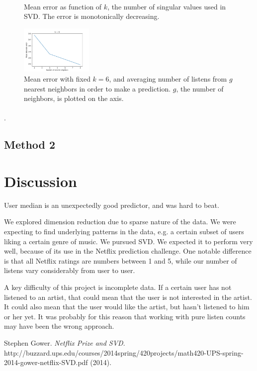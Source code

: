 \documentclass[11pt]{article}
\begin{document}
\begin{figure}[]
\begin{subfigure}[!t]{0.31\textwidth}
    \end{subfigure}\\
        \caption{Mean error as function of $k$, the number of singular values used in SVD. The error is monotonically decreasing.}
            \label{SVD_k}
\end{figure}


\begin{figure}[] 
\centering
        \includegraphics[width=0.31\textwidth]{Plots/SVD_group_8.png}
        \caption{Mean error with fixed $k=6$, and averaging number of listens from $g$ nearest neighbors in order to make a prediction. $g$, the number of neighbors, is plotted on the axis.}
            \label{SVD_g}
\end{figure}


\paragraph{}.
\subsection{Method 2}
\paragraph{}

\section{Discussion} 

User median is an unexpectedly good predictor, and was hard to beat.

We explored dimension reduction due to sparse nature of the data. We were expecting to find underlying patterns in the data, e.g. a certain subset of users liking a certain genre of music. We pursued SVD. We expected it to perform very well, because of its use in the Netflix prediction challenge. One notable difference is that all Netflix ratings are numbers between 1 and 5, while our number of listens vary considerably from user to user. 

A key difficulty of this project is incomplete data. If a certain user has not listened to an artist, that could mean that the user is not interested in the artist. It could also mean that the user would like the artist, but hasn't listened to him or her yet. It was probably for this reason that working with pure listen counts may have been the wrong approach.

 \begin{thebibliography}{1}

   Stephen Gower. {\em Netflix Prize and SVD}. http://buzzard.ups.edu/courses/2014spring/420projects/math420-UPS-spring-2014-gower-netflix-SVD.pdf (2014).

  \end{thebibliography}
\end{document}
